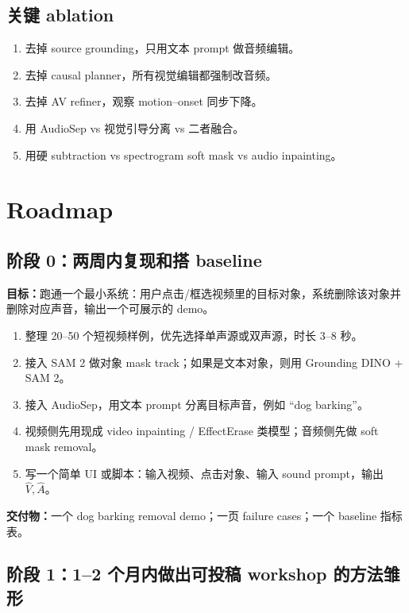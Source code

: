 \subsection{关键 ablation}

\begin{enumerate}[leftmargin=2em]
  \item 去掉 source grounding，只用文本 prompt 做音频编辑。
  \item 去掉 causal planner，所有视觉编辑都强制改音频。
  \item 去掉 AV refiner，观察 motion--onset 同步下降。
  \item 用 AudioSep vs 视觉引导分离 vs 二者融合。
  \item 用硬 subtraction vs spectrogram soft mask vs audio inpainting。
\end{enumerate}

\section{Roadmap}

\subsection{阶段 0：两周内复现和搭 baseline}

\begin{summarybox}
\textbf{目标：}跑通一个最小系统：用户点击/框选视频里的目标对象，系统删除该对象并删除对应声音，输出一个可展示的 demo。
\end{summarybox}

\begin{enumerate}[leftmargin=2em]
  \item 整理 20--50 个短视频样例，优先选择单声源或双声源，时长 3--8 秒。
  \item 接入 SAM 2 做对象 mask track；如果是文本对象，则用 Grounding DINO + SAM 2。
  \item 接入 AudioSep，用文本 prompt 分离目标声音，例如 ``dog barking''。
  \item 视频侧先用现成 video inpainting / EffectErase 类模型；音频侧先做 soft mask removal。
  \item 写一个简单 UI 或脚本：输入视频、点击对象、输入 sound prompt，输出 $\hat V,\hat A$。
\end{enumerate}

\textbf{交付物：}一个 dog barking removal demo；一页 failure cases；一个 baseline 指标表。

\subsection{阶段 1：1--2 个月内做出可投稿 workshop 的方法雏形}

